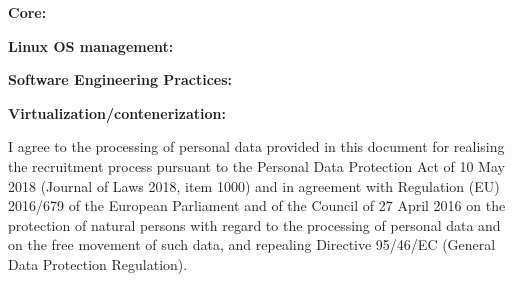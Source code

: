 \documentclass[10pt,a4paper,ragged2e,withhyper]{altacv}
\begin{document}
\begin{paracol}{2}
\textbf{Core:} \normalsize\smallskip\\
\medskip

\textbf{Linux OS management:} \normalsize\smallskip\\
\medskip

\textbf{Software Engineering Practices:} \normalsize\smallskip\\
\medskip

\textbf{Virtualization/contenerization:} \normalsize\smallskip\\





\medskip















\end{paracol}

I agree to the processing of personal data provided in this document for realising the recruitment process pursuant to the Personal Data Protection Act of 10 May 2018 (Journal of Laws 2018, item 1000) and in agreement with Regulation (EU) 2016/679 of the European Parliament and of the Council of 27 April 2016 on the protection of natural persons with regard to the processing of personal data and on the free movement of such data, and repealing Directive 95/46/EC (General Data Protection Regulation).
\end{document}
